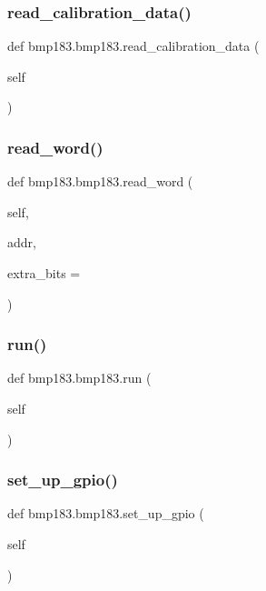\subsubsection{\texorpdfstring{read\+\_\+calibration\+\_\+data()}{read\_calibration\_data()}}
{\footnotesize\ttfamily def bmp183.\+bmp183.\+read\+\_\+calibration\+\_\+data (\begin{DoxyParamCaption}\item[{}]{self }\end{DoxyParamCaption})}

\mbox{\label{classbmp183_1_1bmp183_acb489a2b4069a82181778661ab03a253}} 
\subsubsection{\texorpdfstring{read\+\_\+word()}{read\_word()}}
{\footnotesize\ttfamily def bmp183.\+bmp183.\+read\+\_\+word (\begin{DoxyParamCaption}\item[{}]{self,  }\item[{}]{addr,  }\item[{}]{extra\+\_\+bits = {} }\end{DoxyParamCaption})}

\mbox{\label{classbmp183_1_1bmp183_a1cd6a20d6910bd850cd98df4c0ddb7d7}} 
\subsubsection{\texorpdfstring{run()}{run()}}
{\footnotesize\ttfamily def bmp183.\+bmp183.\+run (\begin{DoxyParamCaption}\item[{}]{self }\end{DoxyParamCaption})}

\mbox{\label{classbmp183_1_1bmp183_ac97968b3dac366872efb1c35a0075894}} 
\subsubsection{\texorpdfstring{set\+\_\+up\+\_\+gpio()}{set\_up\_gpio()}}
{\footnotesize\ttfamily def bmp183.\+bmp183.\+set\+\_\+up\+\_\+gpio (\begin{DoxyParamCaption}\item[{}]{self }\end{DoxyParamCaption})}

